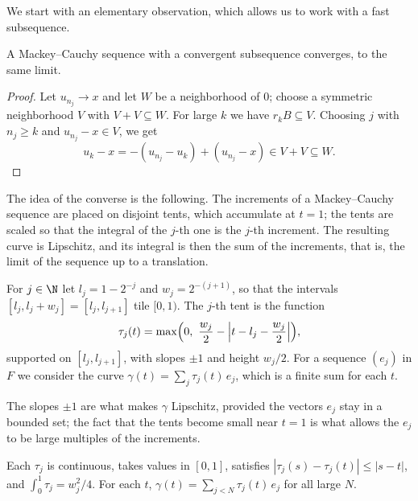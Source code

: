 We start with an elementary observation, which allows us to work with a fast subsequence.

\begin{lemma}[Subsequences]
  \label{lem:mackey-subseq}
  \leanok
  A Mackey--Cauchy sequence with a convergent subsequence converges, to the same limit.
\end{lemma}

\begin{proof}
  \leanok
  Let $u_{n_j} \to x$ and let $W$ be a neighborhood of $0$; choose a symmetric neighborhood $V$
  with $V + V \subseteq W$. For large $k$ we have $r_k B \subseteq V$. Choosing $j$ with
  $n_j \geq k$ and $u_{n_j} - x \in V$, we get
  \[
    u_k - x = -(u_{n_j} - u_k) + (u_{n_j} - x) \in V + V \subseteq W .
  \]
\end{proof}

The idea of the converse is the following. The increments of a Mackey--Cauchy sequence are
placed on disjoint tents, which accumulate at $t = 1$; the tents are scaled so that the
integral of the $j$-th one is the $j$-th increment. The resulting curve is Lipschitz, and its
integral is then the sum of the increments, that is, the limit of the sequence up to a
translation.

\begin{definition}[Tents]
  \label{def:tents}
  \leanok
  For $j \in \N$ let $l_j = 1 - 2^{-j}$ and $w_j = 2^{-(j+1)}$, so that the intervals
  $[l_j, l_j + w_j] = [l_j, l_{j+1}]$ tile $[0, 1)$. The $j$-th tent is the function
  \[
    \tau_j(t) = \max\Bigl(0,\ \frac{w_j}{2} - \Bigl|t - l_j - \frac{w_j}{2}\Bigr|\Bigr),
  \]
  supported on $[l_j, l_{j+1}]$, with slopes $\pm 1$ and height $w_j / 2$. For a sequence
  $(e_j)$ in $F$ we consider the curve $\gamma(t) = \sum_j \tau_j(t)\, e_j$, which is a finite
  sum for each $t$.
\end{definition}

The slopes $\pm 1$ are what makes $\gamma$ Lipschitz, provided the vectors $e_j$ stay in a
bounded set; the fact that the tents become small near $t = 1$ is what allows the $e_j$ to be
large multiples of the increments.

\begin{lemma}
  \label{lem:tents}
  \leanok
  Each $\tau_j$ is continuous, takes values in $[0, 1]$, satisfies
  $|\tau_j(s) - \tau_j(t)| \leq |s - t|$, and $\int_0^1 \tau_j = w_j^2 / 4$. For each $t$,
  $\gamma(t) = \sum_{j < N} \tau_j(t)\, e_j$ for all large $N$.
\end{lemma}


